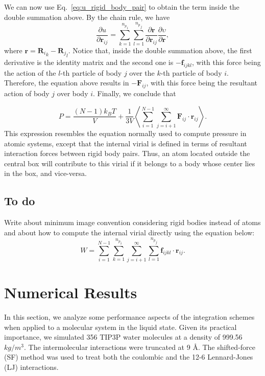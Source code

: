 \documentclass[aip,jcp,reprint,amsmath,amssymb,raggedbottom]{revtex4-1}
\newcommand{\vt}[1]{\boldsymbol{\mathbf{#1}}}           %
\newcommand{\diff}[2]{\dfrac{\partial #1}{\partial #2}} %
\begin{document}
We can now use Eq.~\ref{eq:u_rigid_body_pair} to obtain the term inside the double summation above. By the chain rule, we have
\[
\diff{u}{{\vt r}_{ij}} = \sum_{k=1}^{{n_p}_i} \sum_{l=1}^{{n_p}_j} \diff{\vt r}{\vt r_{ij}} \diff{\upsilon}{\vt r},
\]
where $\vt r = {{\vt R}_i}_k - {{\vt R}_j}_l$. Notice that, inside the double summation above, the first derivative is the identity matrix and the second one is $-{\vt f}_{ijkl}$, with this force being the action of the $l$-th particle of body $j$ over the $k$-th particle of body $i$. Therefore, the equation above results in $-\vt F_{ij}$, with this force being the resultant action of body $j$ over body $i$. Finally, we conclude that

\begin{equation}
\label{eq:pressure}
P = \frac{(N-1) k_B T}{V} + \frac{1}{3V} \left\langle \sum_{i=1}^{N-1} \sum_{j=i+1}^{\infty}{\vt F}_{ij} \cdot {\vt r}_{ij}  \right\rangle.
\end{equation}
This expression resembles the equation normally used to compute pressure in atomic systems, except that the internal virial is defined in terms of resultant interaction forces between rigid body pairs. Thus, an atom located outside the central box will contribute to this virial if it belongs to a body whose center lies in the box, and vice-versa.

\subsection{To do}

Write about minimum image convention considering rigid bodies instead of atoms and about how to compute the internal virial directly using the equation below:
\[
W = \sum_{i=1}^{N-1} \sum_{k=1}^{{n_p}_i} \sum_{j=i+1}^{\infty} \sum_{l=1}^{{n_p}_j} {\vt f}_{ijkl} \cdot {\vt r}_{ij}.
\]

\section{Numerical Results}

In this section, we analyze some performance aspects of the integration schemes when applied to a molecular system in the liquid state. Given its practical importance, we simulated 356 TIP3P\cite{Price2004} water molecules at a density of 999.56 $kg/m^3$. The intermolecular interactions were truncated at 9 {\AA}. The shifted-force (SF) method\cite{Allen1989,Toxvaerd_2011} was used to treat both the coulombic and the 12-6 Lennard-Jones (LJ) interactions.
\end{document}
